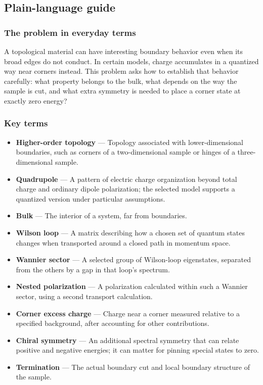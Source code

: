 \documentclass[
  11pt,
]{article}
\begin{document}
\subsection{Plain-language guide}

\subsubsection{The problem in everyday terms}

A topological material can have interesting boundary behavior even when
its broad edges do not conduct. In certain models, charge accumulates in
a quantized way near corners instead. This problem asks how to establish
that behavior carefully: what property belongs to the bulk, what depends
on the way the sample is cut, and what extra symmetry is needed to place
a corner state at exactly zero energy?

\subsubsection{Key terms}

\begin{itemize}
\item
  \textbf{Higher-order topology} --- Topology associated with
  lower-dimensional boundaries, such as corners of a two-dimensional
  sample or hinges of a three-dimensional sample.
\item
  \textbf{Quadrupole} --- A pattern of electric charge organization
  beyond total charge and ordinary dipole polarization; the selected
  model supports a quantized version under particular assumptions.
\item
  \textbf{Bulk} --- The interior of a system, far from boundaries.
\item
  \textbf{Wilson loop} --- A matrix describing how a chosen set of
  quantum states changes when transported around a closed path in
  momentum space.
\item
  \textbf{Wannier sector} --- A selected group of Wilson-loop
  eigenstates, separated from the others by a gap in that loop's
  spectrum.
\item
  \textbf{Nested polarization} --- A polarization calculated within such
  a Wannier sector, using a second transport calculation.
\item
  \textbf{Corner excess charge} --- Charge near a corner measured
  relative to a specified background, after accounting for other
  contributions.
\item
  \textbf{Chiral symmetry} --- An additional spectral symmetry that can
  relate positive and negative energies; it can matter for pinning
  special states to zero.
\item
  \textbf{Termination} --- The actual boundary cut and local boundary
  structure of the sample.
\end{itemize}
\end{document}
